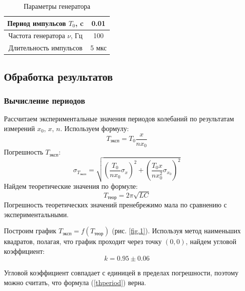 \documentclass{article}
\begin{document}
   \begin{table} [h]
   \centering
   \caption{Параметры генератора}
   \begin{tabular}{|*{2}{c|}}
   \hline 
   Период импульсов $T_0$, c & 0.01 \\ \hline 
   Частота генератора $\nu$, Гц & 100 \\ \hline 
   Длительность импульсов & 5 мкс \\ \hline
   \end{tabular} 
   \end{table} 
   
   
   \subsection*{Обработка результатов}
   \subsubsection*{Вычисление периодов}
   Рассчитаем экспериментальные значения периодов колебаний по результатам измерений $x_0$, $x$, $n$. Используем формулу:
   $$ T_{\text{эксп}} = T_0\frac{x}{nx_0} $$
   Погрешность $T_{\text{эксп}}$:
   $$ \sigma_{T_{\text{эксп}}} = \sqrt{\left(\frac{T_0}{nx_0}\sigma_x\right)^2 + \left(\frac{T_0x}{nx_0^2}\sigma_{x_0}\right)^2} $$
   Найдем теоретические значения по формуле:
   \begin{equation} 
   	   \label{thperiod}
       T_{\text{теор}} = 2\pi\sqrt{LC}
   \end{equation}
   Погрешность теоретических значений пренебрежимо мала по сравнению с экспериментальными.

   Построим график $T_{\text{эксп}} = f(T_{\text{теор}})$ (рис. \ref{fig.1}). Используя метод наименьших квадратов, полагая, что график проходит через точку $(0, 0)$, найдем угловой коэффициент: 
   $$ k = 0.95 \pm 0.06 $$

   Угловой коэффициент совпадает с единицей в пределах погрешности, поэтому можно считать, что формула (\ref{thperiod}) верна.
   
\end{document}
